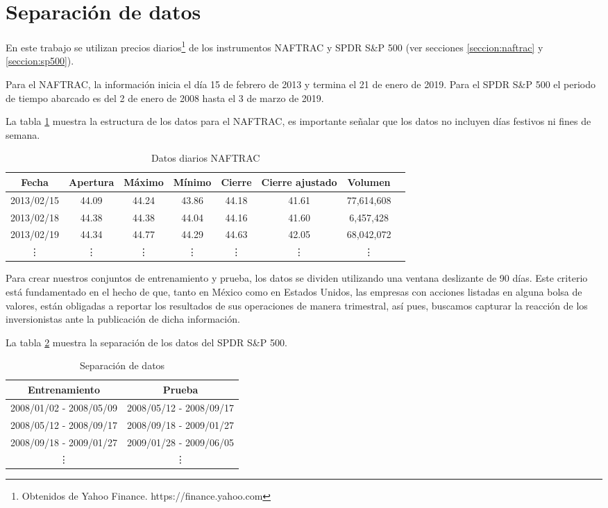 \documentclass[12pt]{scrbook}
\theoremstyle{break}
\theoremstyle{break}
\begin{document}
\section{Separación de datos}
\label{seccion:separacion de datos}
En este trabajo se utilizan precios diarios\footnote{Obtenidos de Yahoo Finance. https://finance.yahoo.com} de los instrumentos NAFTRAC y SPDR S\&P 500 (ver secciones \ref{seccion:naftrac} y \ref{seccion:sp500}).

Para el NAFTRAC, la información inicia el día 15 de febrero de 2013 y termina el 21 de enero de 2019. Para el SPDR S\&P 500 el periodo de tiempo abarcado es del 2 de enero de 2008 hasta  el 3 de marzo de 2019.

La tabla \ref{tabla:Ejemplo datos diarios NAFTRAC} muestra la estructura de los datos para el NAFTRAC, es importante señalar que los datos no incluyen días festivos ni fines de semana.

\begin{table}[h]
\centering
\begin{tabular}{cccccccc}
\hline
\textbf{Fecha} & \textbf{Apertura} & \textbf{Máximo} & \textbf{Mínimo} & \textbf{Cierre} & \textbf{Cierre ajustado} & \textbf{Volumen} \\
\hline
2013/02/15 & 44.09 & 44.24 & 43.86 & 44.18 & 41.61 & 77,614,608\\
2013/02/18 & 44.38 & 44.38 & 44.04 & 44.16 & 41.60 & 6,457,428\\
2013/02/19 & 44.34 & 44.77 & 44.29 & 44.63 & 42.05 & 68,042,072\\
\vdots & \vdots & \vdots & \vdots & \vdots & \vdots & \vdots \\
\hline
\end{tabular}
\caption{\label{tabla:Ejemplo datos diarios NAFTRAC} Datos diarios NAFTRAC}
\end{table}

Para crear nuestros conjuntos de entrenamiento y prueba, los datos se dividen utilizando una ventana deslizante de 90 días. Este criterio está fundamentado en el hecho de que, tanto en México como en Estados Unidos, las empresas con acciones listadas en alguna bolsa de valores, están obligadas a reportar los resultados de sus operaciones de manera trimestral, así pues, buscamos capturar la reacción de los inversionistas ante la publicación de dicha información.

La tabla \ref{tabla:data split SP500} muestra la separación de los datos del SPDR S\&P 500.
\begin{table}[h]
\centering
\begin{tabular}{cc}
\hline
\textbf{Entrenamiento} & \textbf{Prueba} \\
\hline
2008/01/02 - 2008/05/09 & 2008/05/12 - 2008/09/17 \\
2008/05/12 - 2008/09/17 & 2008/09/18 - 2009/01/27 \\
2008/09/18 - 2009/01/27 & 2009/01/28 - 2009/06/05 \\
\vdots & \vdots \\
\hline
\end{tabular}
\caption{\label{tabla:data split SP500} Separación de datos}
\end{table}
\end{document}

